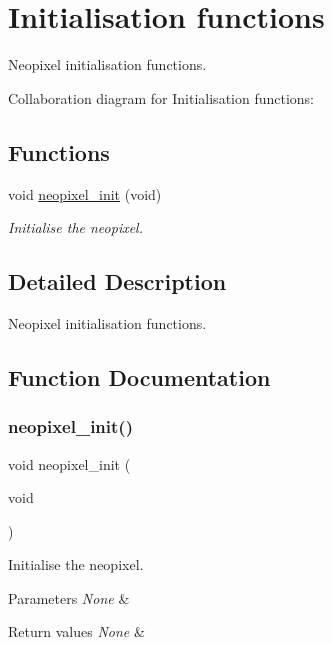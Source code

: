 \hypertarget{group___neo_pixel___init}{}\section{Initialisation functions}
\label{group___neo_pixel___init}


Neopixel initialisation functions.  


Collaboration diagram for Initialisation functions\+:
\subsection*{Functions}
\begin{DoxyCompactItemize}
\item 
void \hyperlink{group___neo_pixel___init_gaac78468985e44a3e4d353ea9276b33bc}{neopixel\+\_\+init} (void)
\begin{DoxyCompactList}\small\item\em Initialise the neopixel. \end{DoxyCompactList}\end{DoxyCompactItemize}


\subsection{Detailed Description}
Neopixel initialisation functions. 



\subsection{Function Documentation}
\mbox{\label{group___neo_pixel___init_gaac78468985e44a3e4d353ea9276b33bc}} 
\subsubsection{\texorpdfstring{neopixel\+\_\+init()}{neopixel\_init()}}
{\footnotesize\ttfamily void neopixel\+\_\+init (\begin{DoxyParamCaption}\item[{void}]{ }\end{DoxyParamCaption})}



Initialise the neopixel. 


\begin{DoxyParams}{Parameters}
{\em None} & \\
\hline
\end{DoxyParams}

\begin{DoxyRetVals}{Return values}
{\em None} & \\
\hline
\end{DoxyRetVals}
